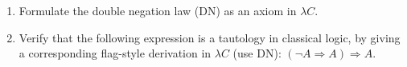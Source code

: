 \begin{problem}{7.2}
    \begin{enumerate}[label=$(\alph*)$]
    \item Formulate the double negation law (DN) as an axiom in $\lambda C$.
    \item Verify that the following expression is a tautology in classical logic, by giving a corresponding flag-style derivation in $\lambda C$ (use DN):
        $(\neg A\Rightarrow A)\Rightarrow A$.
    \end{enumerate}
\end{problem}
